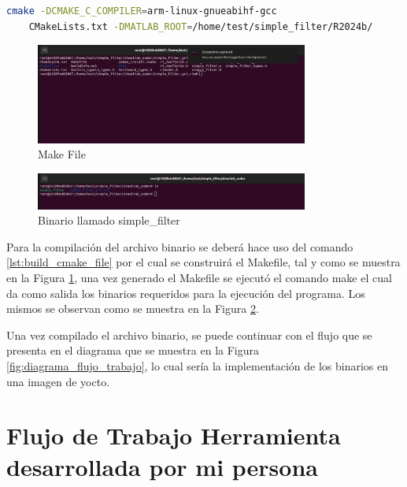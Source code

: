 \begin{lstlisting}[language=bash, caption={Compilacion del programa, Linux}, label=lst:build_cmake_file]
    cmake -DCMAKE_C_COMPILER=arm-linux-gnueabihf-gcc 
    CMakeLists.txt -DMATLAB_ROOT=/home/test/simple_filter/R2024b/
\end{lstlisting}

\begin{figure}[h!]
    \centering
    \includegraphics[width=0.8\textwidth]{fig/especifico_2/paso_a_paso_mtmt/cmake_file.png}
    \caption{Make File}
    \label{fig:make_file}
\end{figure}


\begin{figure}[h!]
    \centering
    \includegraphics[width=0.8\textwidth]{fig/especifico_2/paso_a_paso_mtmt/binario_compilado.png}
    \caption{Binario llamado simple\_filter}
    \label{fig:binario_compilado}
\end{figure}

Para la compilación del archivo binario se deberá hace uso del comando \ref{lst:build_cmake_file} por el cual se construirá el Makefile, tal y como se muestra en la Figura \ref{fig:make_file}, una vez generado el Makefile se ejecutó el comando make el cual da como salida los binarios requeridos para la ejecución del programa. Los mismos se observan como se muestra en la Figura \ref{fig:binario_compilado}.

Una vez compilado el archivo binario, se puede continuar con el flujo que se presenta en el diagrama que se muestra en la Figura \ref{fig:diagrama_flujo_trabajo}, lo cual sería la implementación de los binarios en una imagen de yocto.


\section{Flujo de Trabajo Herramienta desarrollada por mi persona}

